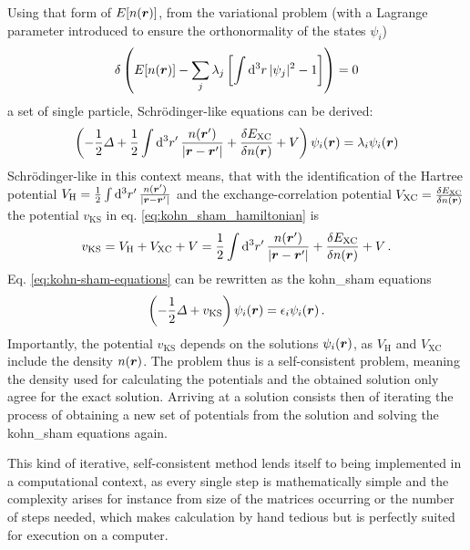 \documentclass[main.tex]{subfiles}
\begin{document}
Using that form of \(E[n(\vb*{r})]\), from the variational problem (with a Lagrange parameter introduced to ensure the orthonormality of the states \(\psi_i\))
\begin{align}
     \delta \left( E [n(\vb*{r})] - \sum_j \lambda_j \left[\int \dd[3]{r} \vert \psi_j \vert^2 - 1 \right] \right) = 0
\end{align}
a set of single particle, Schrödinger-like equations can be derived:
\begin{equation}\label{eq:kohn-sham-equations}
    \left(-\frac{1}{2} \Delta + \frac{1}{2} \int \dd[3]{r^{\prime}} \frac{n(\vb*{r}^{\prime})}{\vert \vb*{r} - \vb*{r}^{\prime} \vert} + \fdv{E_{\mathrm{XC}}}{n(\vb*{r})} + V\right) \psi_i (\vb*{r}) = \lambda_i \psi_i (\vb*{r})
\end{equation}
Schrödinger-like in this context means, that with the identification of the Hartree potential \(V_{\mathrm{H}} = \frac{1}{2} \int \dd[3]{r^{\prime}} \frac{n(\vb*{r}^{\prime})}{\vert \vb*{r} - \vb*{r}^{\prime} \vert}\) and the exchange-correlation potential \(V_{\mathrm{XC}} = \fdv{E_{\mathrm{XC}}}{n(\vb*{r})}\) the potential \(v_{\mathrm{KS}}\) in eq. \ref{eq:kohn_sham_hamiltonian} is
\begin{equation}
    v_{\mathrm{KS}} =  V_{\mathrm{H}} + V_{\mathrm{XC}} + V = \frac{1}{2} \int \dd[3]{r^{\prime}} \frac{n(\vb*{r}^{\prime})}{\vert \vb*{r} - \vb*{r}^{\prime} \vert} + \fdv{E_{\mathrm{XC}}}{n(\vb*{r})} + V\,.
\end{equation}
Eq. \ref{eq:kohn-sham-equations} can be rewritten as the \acrshort{kohn_sham} equations
\begin{equation}
    \left(- \frac{1}{2} \Delta + v_{\mathrm{KS}}\right) \psi_i (\vb*{r}) = \epsilon_i \psi_i (\vb*{r})\,.
\end{equation}
Importantly, the potential \(v_{\mathrm{KS}}\) depends on the solutions \(\psi_i (\vb*{r})\), as \(V_{\mathrm{H}}\) and \(V_{\mathrm{XC}}\) include the density \(n(\vb*{r})\).
The problem thus is a self-consistent problem, meaning the density used for calculating the potentials and the obtained solution only agree for the exact solution.
Arriving at a solution consists then of iterating the process of obtaining a new set of potentials from the solution and solving the \acrshort{kohn_sham} equations again.

This kind of iterative, self-consistent method lends itself to being implemented in a computational context, as every single step is mathematically simple and the complexity arises for instance from size of the matrices occurring or the number of steps needed, which makes calculation by hand tedious but is perfectly suited for execution on a computer.
\end{document}
